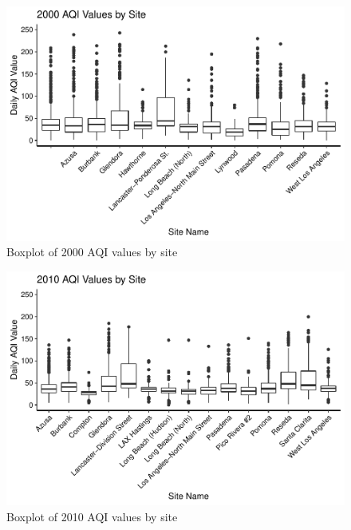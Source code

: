 \documentclass[12pt,]{article}
\begin{document}
\begin{figure}
\centering
\includegraphics{Roth_ENV872_Project_files/figure-latex/box plot 3-1.pdf}
\caption{Boxplot of 2000 AQI values by site}
\end{figure}

\begin{figure}
\centering
\includegraphics{Roth_ENV872_Project_files/figure-latex/box plot 4-1.pdf}
\caption{Boxplot of 2010 AQI values by site}
\end{figure}
\end{document}
